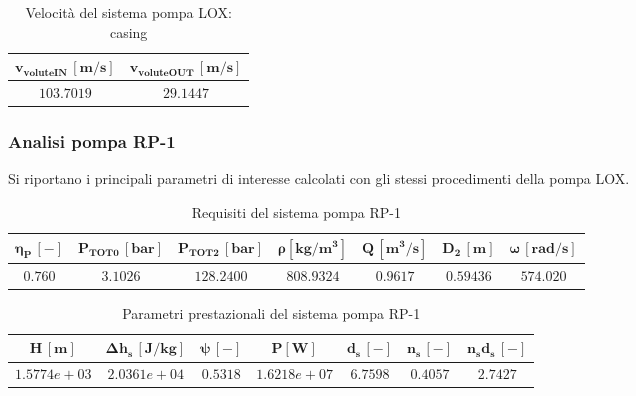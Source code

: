 \begin{table}[H]
\centering
\begin{tabular}{|c|c|}
\hline
$\bm{v_{voluteIN} \, [m/s]}$ & $\bm{v_{voluteOUT} \, [m/s]}$  \\
\hline
$103.7019$ & $29.1447$   \\
\hline
\end{tabular}

\caption{Velocità del sistema pompa LOX: casing}
\label{table:LOX pump casing}

\end{table}

\subsubsection{Analisi pompa RP-1}
Si riportano i principali parametri di interesse calcolati con gli stessi procedimenti della pompa LOX.

\begin{table}[H]
\centering
\begin{tabular}{|c|c|c|c|c|c|c|}
\hline
$\bm{\eta_P \, [-]}$ & $\bm{P_ {TOT0} \, [bar]}$ & $\bm{P_{TOT2} \, [bar]}$ & $\bm{\rho [kg/m^3]}$ & $\bm{Q \, [m^3/s]}$ & $\bm{D_2 \, [m]}$ & $\bm{\omega \, [rad/s]}$  \\
\hline
$0.760$ & $3.1026$ & $128.2400$ &  $808.9324$ & $0.9617$ & $0.59436$ & $574.020$  \\
\hline
\end{tabular}

\caption{Requisiti del sistema pompa RP-1 \cite{turbopump_manual}}
\label{table:RP-1 pump specs}

\end{table}

\begin{table}[H]
\centering
\begin{tabular}{|c|c|c|c|c|c|c|}
\hline
$\bm{H \, [m]}$ & $\bm{\Delta h_s \, [J/kg]}$ & $\bm{\psi \, [-]}$ & $\bm{P [W]}$ & $\bm{d_s \, [-]}$ & $\bm{n_s \, [-]}$ & $\bm{n_s d_s \, [-]}$  \\
\hline
$1.5774e+03$ & $2.0361e+04$ & $0.5318$ &  $1.6218e+07$ & $6.7598$ & $0.4057$ & $2.7427$  \\
\hline
\end{tabular}

\caption{Parametri prestazionali del sistema pompa RP-1}
\label{table:RP-1 pump performance}

\end{table}

